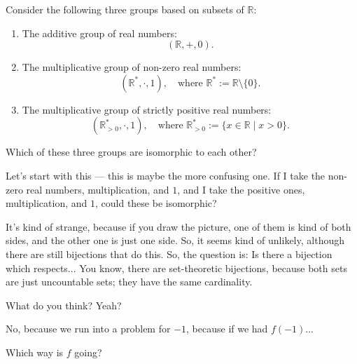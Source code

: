 \begin{content}
Consider the following three groups based on subsets of $\mathbb{R}$:
\begin{enumerate}[label=\textbf{(\arabic*)}]
    \item The additive group of real numbers:
    \[
    (\mathbb{R}, +, 0).
    \]
    \item The multiplicative group of non-zero real numbers:
    \[
    (\mathbb{R}^*, \cdot, 1), \quad \text{where } \mathbb{R}^* := \mathbb{R} \setminus \{0\}.
    \]
    \item The multiplicative group of strictly positive real numbers:
    \[
    (\mathbb{R}^*_{>0}, \cdot, 1), \quad \text{where } \mathbb{R}^*_{>0} := \{ x \in \mathbb{R} \mid x > 0 \}.
    \]
\end{enumerate}

\begin{question}
Which of these three groups are isomorphic to each other?
\end{question}
\end{content}

\begin{speech}[00:15:26 - 00:16:21]
Let's start with this --- this is maybe the more confusing one. If I take the non-zero real numbers, multiplication, and $1$,  and I take the positive ones, multiplication, and $1$,  could these be isomorphic? 

It's kind of strange, because if you draw the picture, one of them is kind of both sides, and the other one is just one side.  So, it seems kind of unlikely, although there are still bijections that do this. So, the question is: Is there a bijection which respects... You know, there are set-theoretic bijections, because both sets are just uncountable sets; they have the same cardinality.

What do you think? Yeah?
\end{speech}

\begin{student}
No, because we run into a problem for $-1$, because if we had $f(-1)$...
\end{student}

\begin{speech}[00:16:31 - 00:16:33]
Which way is $f$ going?
\end{speech}

